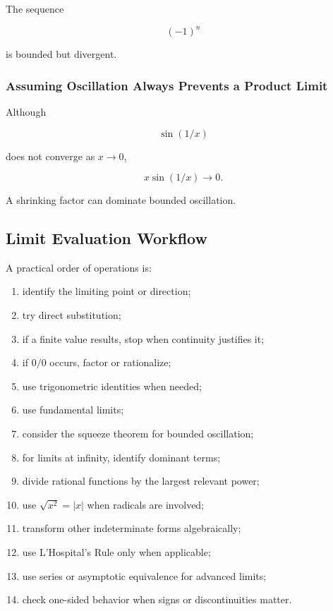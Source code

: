 The sequence

\[
(-1)^n
\]

is bounded but divergent.

\subsubsection{Assuming Oscillation Always Prevents a Product Limit}

Although

\[
\sin(1/x)
\]

does not converge as \(x\to0\),

\[
x\sin(1/x)
\to0.
\]

A shrinking factor can dominate bounded oscillation.

\subsection{Limit Evaluation Workflow}
\label{subsec:limit-evaluation-workflow}

A practical order of operations is:

\begin{enumerate}
    \item identify the limiting point or direction;
    \item try direct substitution;
    \item if a finite value results, stop when continuity justifies it;
    \item if \(0/0\) occurs, factor or rationalize;
    \item use trigonometric identities when needed;
    \item use fundamental limits;
    \item consider the squeeze theorem for bounded oscillation;
    \item for limits at infinity, identify dominant terms;
    \item divide rational functions by the largest relevant power;
    \item use \(\sqrt{x^2}=|x|\) when radicals are involved;
    \item transform other indeterminate forms algebraically;
    \item use L'Hospital's Rule only when applicable;
    \item use series or asymptotic equivalence for advanced limits;
    \item check one-sided behavior when signs or discontinuities matter.
\end{enumerate}


